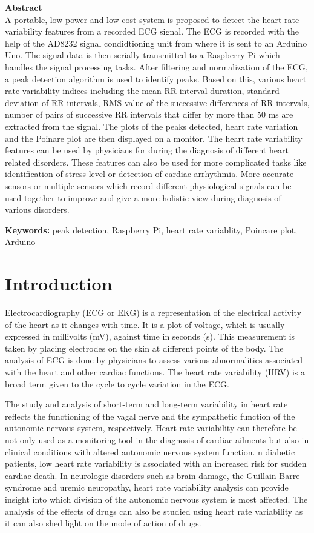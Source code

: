 \documentclass[11pt]{article}
\theoremstyle{definition}
\begin{document}
  \setcounter{page}{1}
  \newpage
  \begin{center}
    \large{\textbf{Abstract}}\\
    A portable, low power and low cost system is proposed to detect the heart rate variability features from a recorded ECG signal.
    The ECG is recorded with the help of the AD8232 signal condidtioning unit from where it is sent to an Arduino Uno.
    The signal data is then serially transmitted to a Raspberry Pi which handles the signal processing tasks. After filtering and normalization of the ECG, a peak detection algorithm is used to identify peaks. Based on this, various heart rate variability indices including the mean RR interval duration, standard deviation of RR intervals, RMS value of the successive differences of RR intervals, number of pairs of successive RR intervals that differ by more than 50 ms are extracted from the signal. The plots of the peaks detected, heart rate variation and the Poinare plot are then displayed on a monitor. The heart rate variability features can be used by physicians for during the diagnosis of different heart related disorders. These features can also be used for more complicated tasks like identification of stress level or detection of cardiac arrhythmia. More accurate sensors or  multiple sensors which record different physiological signals can be used together to improve and give a more holistic view during diagnosis of various disorders.

    \textbf{Keywords:} peak detection, Raspberry Pi, heart rate variablity, Poincare plot, Arduino
  \end{center}

  \section{Introduction}
  Electrocardiography (ECG or EKG) is a representation of the electrical activity of the heart as it changes with time. It is a plot of voltage, which is usually expressed in millivolts (mV), against time in seconds (s). This measurement is taken by placing electrodes on the skin at different points of the body. The analysis of ECG is done by physicians to assess various abnormalities associated with the heart and other cardiac functions. The heart rate variability (HRV) is a broad term given to the cycle to cycle variation in the ECG.

  The study and analysis of short-term and long-term variability in heart rate reflects the functioning of the vagal nerve and the sympathetic function of the autonomic nervous system, respectively.
  Heart rate variability can therefore be not only used as a monitoring tool in the diagnosis of cardiac ailments but also in clinical conditions with altered autonomic nervous system function.
  n diabetic patients, low heart rate variability is associated with an increased risk for sudden cardiac death.
  In neurologic disorders such as brain damage, the Guillain-Barre syndrome and uremic neuropathy, heart rate variability analysis can provide insight into which division of the autonomic nervous system is most affected.
  The analysis of the effects of drugs can also be studied using heart rate variability as it can also shed light on the mode of action of drugs.
\end{document}
